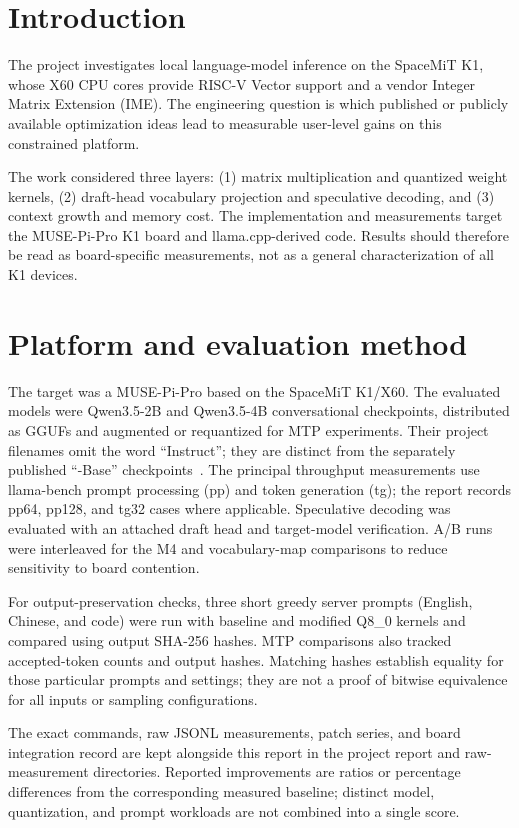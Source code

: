 \documentclass[10pt,twocolumn]{article}
\begin{document}
\section{Introduction}
The project investigates local language-model inference on the SpaceMiT K1, whose X60 CPU cores provide RISC-V Vector support and a vendor Integer Matrix Extension (IME). The engineering question is which published or publicly available optimization ideas lead to measurable user-level gains on this constrained platform.

The work considered three layers: (1) matrix multiplication and quantized weight kernels, (2) draft-head vocabulary projection and speculative decoding, and (3) context growth and memory cost. The implementation and measurements target the MUSE-Pi-Pro K1 board and llama.cpp-derived code. Results should therefore be read as board-specific measurements, not as a general characterization of all K1 devices.

\section{Platform and evaluation method}
The target was a MUSE-Pi-Pro based on the SpaceMiT K1/X60. The evaluated models were Qwen3.5-2B and Qwen3.5-4B conversational checkpoints, distributed as GGUFs and augmented or requantized for MTP experiments. Their project filenames omit the word ``Instruct''; they are distinct from the separately published ``-Base'' checkpoints~\cite{qwen35_2b,qwen35_4b}. The principal throughput measurements use llama-bench prompt processing (pp) and token generation (tg); the report records pp64, pp128, and tg32 cases where applicable. Speculative decoding was evaluated with an attached draft head and target-model verification. A/B runs were interleaved for the M4 and vocabulary-map comparisons to reduce sensitivity to board contention.

For output-preservation checks, three short greedy server prompts (English, Chinese, and code) were run with baseline and modified Q8\_0 kernels and compared using output SHA-256 hashes. MTP comparisons also tracked accepted-token counts and output hashes. Matching hashes establish equality for those particular prompts and settings; they are not a proof of bitwise equivalence for all inputs or sampling configurations.

The exact commands, raw JSONL measurements, patch series, and board integration record are kept alongside this report in the project report and raw-measurement directories. Reported improvements are ratios or percentage differences from the corresponding measured baseline; distinct model, quantization, and prompt workloads are not combined into a single score.
\end{document}
